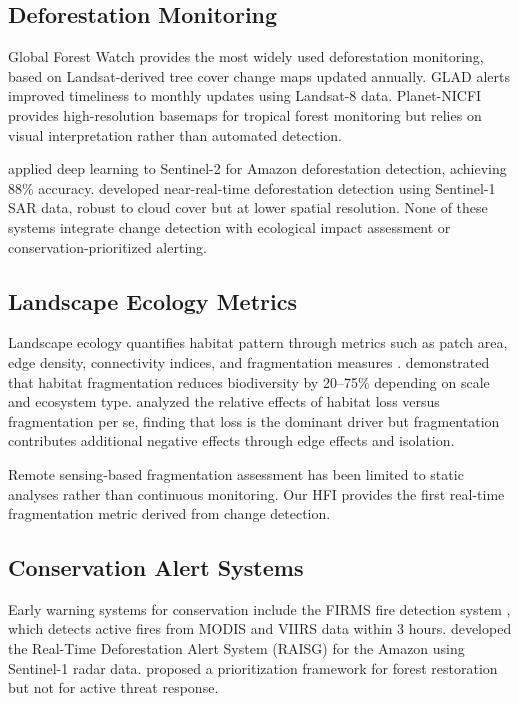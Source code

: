 \documentclass[11pt,a4paper]{article}
\begin{document}
\subsection{Deforestation Monitoring}

Global Forest Watch \citep{hansen2013high} provides the most widely used deforestation monitoring, based on Landsat-derived tree cover change maps updated annually.
GLAD alerts \citep{hansen2016humid} improved timeliness to monthly updates using Landsat-8 data.
Planet-NICFI \citep{planet2020nicfi} provides high-resolution basemaps for tropical forest monitoring but relies on visual interpretation rather than automated detection.

\citet{maretto2020spatio} applied deep learning to Sentinel-2 for Amazon deforestation detection, achieving 88\% accuracy.
\citet{ortega2021near} developed near-real-time deforestation detection using Sentinel-1 SAR data, robust to cloud cover but at lower spatial resolution.
None of these systems integrate change detection with ecological impact assessment or conservation-prioritized alerting.

\subsection{Landscape Ecology Metrics}

Landscape ecology quantifies habitat pattern through metrics such as patch area, edge density, connectivity indices, and fragmentation measures \citep{mcgarigal2012fragstats}.
\citet{haddad2015habitat} demonstrated that habitat fragmentation reduces biodiversity by 20--75\% depending on scale and ecosystem type.
\citet{fahrig2017ecological} analyzed the relative effects of habitat loss versus fragmentation per se, finding that loss is the dominant driver but fragmentation contributes additional negative effects through edge effects and isolation.

Remote sensing-based fragmentation assessment has been limited to static analyses \citep{vogt2007mapping} rather than continuous monitoring.
Our HFI provides the first real-time fragmentation metric derived from change detection.

\subsection{Conservation Alert Systems}

Early warning systems for conservation include the FIRMS fire detection system \citep{giglio2016active}, which detects active fires from MODIS and VIIRS data within 3 hours.
\citet{finer2018combating} developed the Real-Time Deforestation Alert System (RAISG) for the Amazon using Sentinel-1 radar data.
\citet{brancalion2020global} proposed a prioritization framework for forest restoration but not for active threat response.
\end{document}
